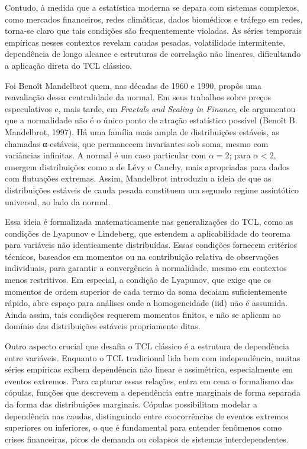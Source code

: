 \documentclass[
]{agujournal2019}
\begin{document}
Contudo, à medida que a estatística moderna se depara com sistemas
complexos, como mercados financeiros, redes climáticas, dados biomédicos
e tráfego em redes, torna-se claro que tais condições são frequentemente
violadas. As séries temporais empíricas nesses contextos revelam caudas
pesadas, volatilidade intermitente, dependência de longo alcance e
estruturas de correlação não lineares, dificultando a aplicação direta
do TCL clássico.

Foi Benoît Mandelbrot quem, nas décadas de 1960 e 1990, propôs uma
reavaliação dessa centralidade da normal. Em seus trabalhos sobre preços
especulativos e, mais tarde, em \emph{Fractals and Scaling in Finance},
ele argumentou que a normalidade não é o único ponto de atração
estatístico possível (Benoît B. Mandelbrot, 1997). Há uma família mais
ampla de distribuições estáveis, as chamadas α-estáveis, que permanecem
invariantes sob soma, mesmo com variâncias infinitas. A normal é um caso
particular com \(\alpha = 2\); para \(\alpha < 2\), emergem
distribuições como a de Lévy e Cauchy, mais apropriadas para dados com
flutuações extremas. Assim, Mandelbrot introduziu a ideia de que as
distribuições estáveis de cauda pesada constituem um segundo regime
assintótico universal, ao lado da normal.

Essa ideia é formalizada matematicamente nas generalizações do TCL, como
as condições de Lyapunov e Lindeberg, que estendem a aplicabilidade do
teorema para variáveis não identicamente distribuídas. Essas condições
fornecem critérios técnicos, baseados em momentos ou na contribuição
relativa de observações individuais, para garantir a convergência à
normalidade, mesmo em contextos menos restritivos. Em especial, a
condição de Lyapunov, que exige que os momentos de ordem superior de
cada termo da soma decaiam suficientemente rápido, abre espaço para
análises onde a homogeneidade (iid) não é assumida. Ainda assim, tais
condições requerem momentos finitos, e não se aplicam ao domínio das
distribuições estáveis propriamente ditas.

Outro aspecto crucial que desafia o TCL clássico é a estrutura de
dependência entre variáveis. Enquanto o TCL tradicional lida bem com
independência, muitas séries empíricas exibem dependência não linear e
assimétrica, especialmente em eventos extremos. Para capturar essas
relações, entra em cena o formalismo das cópulas, funções que descrevem
a dependência entre marginais de forma separada da forma das
distribuições marginais. Cópulas possibilitam modelar a dependência nas
caudas, distinguindo entre coocorrências de eventos extremos superiores
ou inferiores, o que é fundamental para entender fenômenos como crises
financeiras, picos de demanda ou colapsos de sistemas interdependentes.
\end{document}
